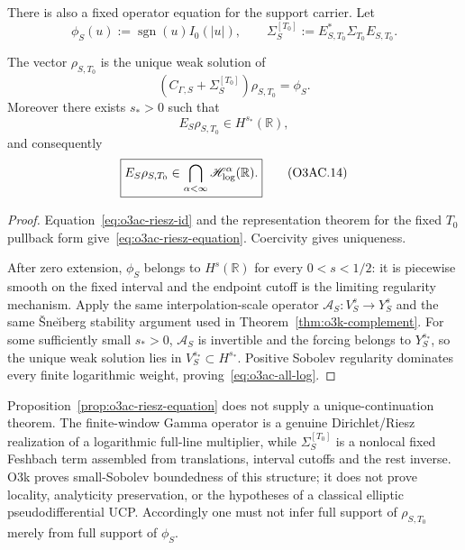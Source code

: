 There is also a fixed operator equation for the support carrier.  Let
\[
 \phi_S(u):=\operatorname{sgn}(u)I_0(|u|),
 \qquad
 \Sigma_S^{[T_0]}:=E_{S,T_0}^*\Sigma_{T_0}E_{S,T_0}.
\]

\begin{proposition}
\label{prop:o3ac-riesz-equation}
The vector $\rho_{S,T_0}$ is the unique weak solution of
\[
 \boxed{
 (C_{\Gamma,S}+\Sigma_S^{[T_0]})\rho_{S,T_0}=\phi_S.
 }
\tag{O3AC.12}\label{eq:o3ac-riesz-equation}
\]
Moreover there exists $s_*>0$ such that
\[
 \boxed{
 E_S\rho_{S,T_0}\in H^{s_*}(\mathbb R),
 }
\tag{O3AC.13}\label{eq:o3ac-positive-sobolev}
\]
and consequently
\[
 \boxed{
 E_S\rho_{S,T_0}
 \in\bigcap_{\alpha<\infty}\mathscr H_{\log}^\alpha(\mathbb R).
 }
\tag{O3AC.14}\label{eq:o3ac-all-log}
\]
\end{proposition}

\begin{proof}
Equation~\eqref{eq:o3ac-riesz-id} and the representation theorem for the fixed
$T_0$ pullback form give~\eqref{eq:o3ac-riesz-equation}.  Coercivity gives uniqueness.

After zero extension, $\phi_S$ belongs to $H^s(\mathbb R)$ for every
$0<s<1/2$: it is piecewise smooth on the fixed interval and the endpoint cutoff is the
limiting regularity mechanism.  Apply the same interpolation-scale operator
$\mathcal A_S:V_S^s\to Y_S^s$ and the same \v Sne\u\i berg stability argument used in
Theorem~\ref{thm:o3k-complement}.  For some sufficiently small $s_*>0$,
$\mathcal A_S$ is invertible and the forcing belongs to $Y_S^{s_*}$, so the unique weak
solution lies in $V_S^{s_*}\subset H^{s_*}$.  Positive Sobolev regularity dominates
every finite logarithmic weight, proving~\eqref{eq:o3ac-all-log}.
\end{proof}

\begin{remark}
\label{rem:o3ac-ucp-firewall}
Proposition~\ref{prop:o3ac-riesz-equation} does not supply a unique-continuation theorem.
The finite-window Gamma operator is a genuine Dirichlet/Riesz realization of a
logarithmic full-line multiplier, while $\Sigma_S^{[T_0]}$ is a nonlocal fixed Feshbach
term assembled from translations, interval cutoffs and the rest inverse.  O3k proves
small-Sobolev boundedness of this structure; it does not prove locality, analyticity
preservation, or the hypotheses of a classical elliptic pseudodifferential UCP.
Accordingly one must not infer full support of $\rho_{S,T_0}$ merely from full support
of $\phi_S$.
\end{remark}

